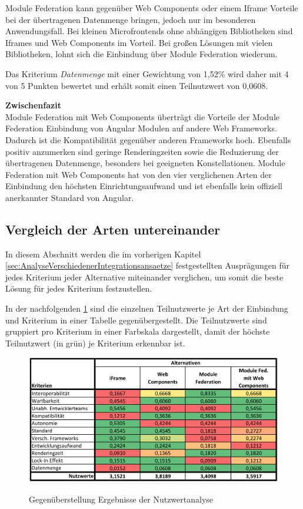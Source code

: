 Module Federation kann gegenüber Web Components oder einem Iframe Vorteile bei der übertragenen Datenmenge bringen, jedoch nur im besonderen Anwendungsfall. Bei kleinen Microfrontends ohne abhängigen Bibliotheken sind Iframes und Web Components im Vorteil. Bei großen Lösungen mit vielen Bibliotheken, lohnt sich die Einbindung über Module Federation wiederum.

Das Kriterium \textit{Datenmenge} mit einer Gewichtung von 1,52\% wird daher mit 4 von 5 Punkten bewertet und erhält somit einen Teilnutzwert von 0,0608.

\textbf{Zwischenfazit}\\
Module Federation mit Web Components überträgt die Vorteile der Module Federation Einbindung von Angular Modulen auf andere Web Frameworks. Dadurch ist die Kompatibilität gegenüber anderen Frameworks hoch. Ebenfalls positiv anzumerken sind geringe Renderingzeiten sowie die Reduzierung der übertragenen Datenmenge, besonders bei geeigneten Konstellationen. Module Federation mit Web Components hat von den vier verglichenen Arten der Einbindung den höchsten Einrichtungsaufwand und ist ebenfalls kein offiziell anerkannter Standard von Angular.

\subsection{Vergleich der Arten untereinander}\label{sec:VergleichDerArten}

In diesem Abschnitt werden die im vorherigen Kapitel \cref{sec:AnalyseVerschiedenerIntegrationsansaetze} festgestellten Ausprägungen für jedes Kriterium jeder Alternative miteinander verglichen, um somit die beste Lösung für jedes Kriterium festzustellen.

In der nachfolgenden \cref{fig:ErgebnisNWA} sind die einzelnen Teilnutzwerte je Art der Einbindung und Kriterium in einer Tabelle gegenübergestellt. Die Teilnutzwerte sind gruppiert pro Kriterium in einer Farbskala dargestellt, damit der höchste Teilnutzwert (in grün) je Kriterium erkennbar ist.

\newpage
\begin{figure}[hbt!]
	\begin{minipage}[t]{1\textwidth}	
		\caption{Gegenüberstellung Ergebnisse der Nutzwertanalyse}
		\includegraphics[width=1\textwidth]{img/ErgebnisNWA}\\ %
		\label{fig:ErgebnisNWA}
	\end{minipage}
\end{figure}

